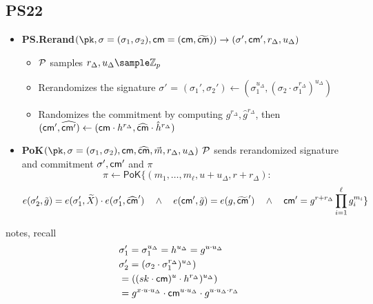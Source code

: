 % 
% 


% 
% 


\newpage
\subsection{PS22 \cite{tomescu2022utt}}

\begin{itemize}
    \item \textbf{PS.Rerand}$(\pk, \sigma = (\sigma_1, \sigma_2), \cm = (\cm, \widetilde{\cm}) ) \to (\sigma', \cm', r_\Delta, u_\Delta)$
    \begin{itemize}
        \item $\mathcal{P}$ samples $r_\Delta, u_\Delta \sample \Z_p$
        \item Rerandomizes the signature $\sigma'$ = $(\sigma_1', \sigma_2') \gets (\sigma_1^{u_\Delta}, (\sigma_2\cdot \sigma_1^{r_\Delta})^{u_\Delta})$
        \item Randomizes the commitment by computing $g^{r_\Delta}, \hat{g}^{r_\Delta}$, then  $(\mathsf{cm}', \widehat{\mathsf{cm}'}) \gets (\mathsf{cm} \cdot h^{r_\Delta}, \widehat{\mathsf{cm}}\cdot \hat{h}^{r_\Delta})$
    \end{itemize}

    \item \textbf{PoK}$(\pk, \sigma = (\sigma_1, \sigma_2), \cm, \widehat{\cm}, \vec{m}, r_\Delta, u_\Delta)$ $\mathcal{P}$ sends rerandomized signature and commitment $\sigma', \mathsf{cm}'$ and $\pi$ 
  \[
        \pi \gets \mathsf{PoK}\{(m_1,\ldots,m_\ell, u+u_\Delta, r+r_\Delta): 
    \]
    \[
         e(\sigma_2', \tilde{g}) = e(\sigma_1', \widetilde{X})\cdot e(\sigma_1', \widehat{\mathsf{cm}}') \quad \wedge \quad
        e(\mathsf{cm}', \tilde{g}) = e(g, \widetilde{\mathsf{cm}}') \quad \wedge \quad
        \mathsf{cm}' = g^{r+r_\Delta} \prod_{i=1}^\ell g_i^{m_i}
        \}
    \]
    
\end{itemize}


notes, recall
\begin{align*}
    &\sigma_1' = \sigma_1^{u_\Delta} = h^{u_\Delta} = g^{u \cdot u_\Delta} \\
    &\sigma_2' = (\sigma_2\cdot \sigma_1^{r_\Delta})^{u_\Delta}) \\
    &= ((sk\cdot \mathsf{cm})^u \cdot h^{r_\Delta})^{u_\Delta}) \\
    &= g^{x \cdot u \cdot u_\Delta} \cdot \mathsf{cm}^{u \cdot u_\Delta}\cdot g^{u \cdot u_\Delta \cdot r_\Delta}\\
\end{align*}



